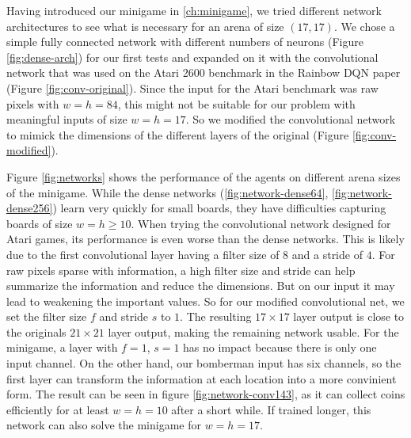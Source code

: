 
Having introduced our minigame in \ref{ch:minigame}, we tried different network architectures to see what is necessary for an arena of size $(17, 17)$.
We chose a simple fully connected network with different numbers of neurons (Figure \ref{fig:dense-arch}) for our first tests and expanded on it with the convolutional network that was used on the Atari 2600 benchmark in the Rainbow DQN paper\cite{Hessel2018RainbowCI} (Figure \ref{fig:conv-original}). Since the input for the Atari benchmark was raw pixels with $w=h=84$, this might not be suitable for our problem with meaningful inputs of size $w=h=17$. So we modified the convolutional network to mimick the dimensions of the different layers of the original (Figure \ref{fig:conv-modified}).

Figure \ref{fig:networks} shows the performance of the agents on different arena sizes of the minigame. While the dense networks (\ref{fig:network-dense64}, \ref{fig:network-dense256}) learn very quickly for small boards, they have difficulties capturing boards of size $w=h\geq10$. When trying the convolutional network designed for Atari games, its performance is even worse than the dense networks. This is likely due to the first convolutional layer having a filter size of $8$ and a stride of $4$. For raw pixels sparse with information, a high filter size and stride can help summarize the information and reduce the dimensions. But on our input it may lead to weakening the important values.
So for our modified convolutional net, we set the filter size $f$ and stride $s$ to $1$. The resulting $17\times17$ layer output is close to the originals $21\times21$ layer output, making the remaining network usable. For the minigame, a layer with $f=1$, $s=1$ has no impact because there is only one input channel. On the other hand, our bomberman input has six channels, so the first layer can transform the information at each location into a more convinient form. The result can be seen in figure \ref{fig:network-conv143}, as it can collect coins efficiently for at least $w=h=10$ after a short while. If trained longer, this network can also solve the minigame for $w=h=17$.


